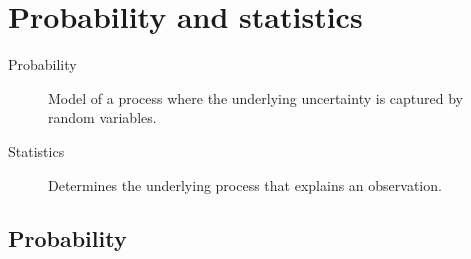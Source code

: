 \chapter{Probability and statistics}


\begin{description}
    \item[Probability]
        Model of a process where the underlying uncertainty is captured by random variables.
    \item[Statistics] 
        Determines the underlying process that explains an observation.
\end{description}


\section{Probability}
